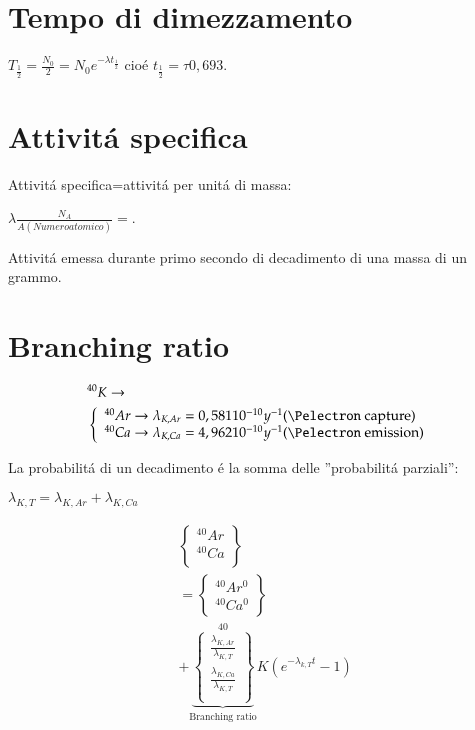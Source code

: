 \documentclass[main.tex]{subfiles}
\newcommand{\mblock}[1]{ {\allowbreak $#1$ }}
\begin{document}
\section{Tempo di dimezzamento}
$T_{\frac{1}{2}}=\frac{N_0}{2}=N_0e^{-\lambda t_{\frac{1}{2}}}$ cio\'e $t_{\frac{1}{2}}=\tau 0,693$.

\section{Attivit\'a specifica}

Attivit\'a specifica=attivit\'a per unit\'a di massa:

$\lambda\frac{N_A}{A(Numero atomico)}=$.

Attivit\'a emessa durante primo secondo di decadimento di una massa di un grammo.

\section{Branching ratio}

\begin{align*}
&^{40}K\to\\
&\left\{\begin{array}{l} ^{40}Ar \to \lambda_{K,Ar}=0,581 10^{-10} y^{-1} \text{(\Pelectron capture)} \\ ^{40}Ca \to \lambda_{K,Ca}=4,962 10^{-10} y^{-1} \text{(\Pelectron emission)}\\ \end{array} \right.\\
\end{align*}

La probabilit\'a di un decadimento \'e la somma delle ''probabilit\'a parziali'':

\mblock{\lambda_{K,T}=\lambda_{K,Ar}+\lambda_{K,Ca}}

\begin{align*}
&\left\{ \begin{array}{c} ^{40}Ar\\^{40}Ca\\ \end{array} \right\}\\
&= \left\{ \begin{array}{c} ^{40}Ar^0 \\ ^{40}Ca^0 \end{array} \right\}\\
&+ \underbrace{\left\{\begin{array}{c} \frac{\lambda_{K,Ar}}{\lambda_{K,T}}\\ \frac{\lambda_{K,Ca}}{\lambda_{K,T}}\\ \end{array}\right\}}_{\text{Branching ratio}}^{40}K(e^{-\lambda_{k,T}t}-1)
\end{align*}
\end{document}
